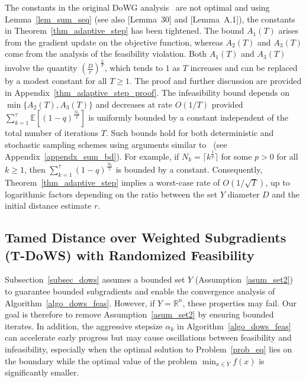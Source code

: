 \documentclass{article}
\newcommand{\EXP}[1]
{\mathbb{E}\!\left[#1\right] }
\theoremstyle{plain}
\theoremstyle{definition}
\theoremstyle{remark}
\begin{document}
The constants in the original DoWG analysis~\cite{khaled2023dowg} are not optimal and using Lemma~\ref{lem_sum_seq} (see also \cite{liu2023stochastic}[Lemma~30] and \cite{moshtaghifar2025dada}[Lemma~A.1]), the constants in Theorem~\ref{thm_adaptive_step} has been tightened. The bound $A_1(T)$ arises from the gradient update on the objective function, whereas $A_2(T)$ and $A_3(T)$ come from the analysis of the feasibility violation. Both $A_1(T)$ and $A_3(T)$ involve the quantity $\left(\frac{D}{r}\right)^{\frac{2}{T}}$, which tends to $1$ as $T$ increases and can be replaced by a modest constant for all $T \geq 1$. The proof and further discussion are provided in Appendix~\ref{thm_adaptive_step_proof}. The infeasibility bound depends on $\min \{A_2(T),A_3(T)\}$ and decreases at rate $O(1/T)$ provided $\sum_{k=1}^\tau \EXP{(1-q)^{\frac{N_{k}}{2}}}$ is uniformly bounded by a constant independent of the total number of iterations $T$. Such bounds hold for both deterministic and stochastic sampling schemes using arguments similar to~\cite{chakraborty2025randomized} (see Appendix~\ref{appendx_sum_bd}). For example, if $N_k = \lceil k^{\frac{1}{p}} \rceil$ for some $p > 0$ for all $k \geq 1$, then $\sum_{k=1}^\tau (1-q)^{\frac{N_{k}}{2}}$ is bounded by a constant. Consequently, Theorem~\ref{thm_adaptive_step} implies a worst-case rate of $O(1/\sqrt{T})$, up to logarithmic factors depending on the ratio between the set $Y$ diameter $D$ and the initial distance estimate $r$.





\subsection{Tamed Distance over Weighted Subgradients (T-DoWS) with Randomized Feasibility}

Subsection~\ref{subsec_dows} assumes a bounded set $Y$ (Assumption~\ref{asum_set2}) to guarantee bounded subgradients and enable the convergence analysis of Algorithm~\ref{algo_dows_feas}. However, if $Y = \mathbb{R}^n$, these properties may fail. Our goal is therefore to remove Assumption~\ref{asum_set2} by ensuring bounded iterates. In addition, the aggressive stepsize $\alpha_k$ in Algorithm~\ref{algo_dows_feas} can accelerate early progress but may cause oscillations between feasibility and infeasibility, especially when the optimal solution to Problem~\eqref{prob_eq} lies on the boundary while the optimal value of the problem $\min_{x \in Y} f(x)$ is significantly smaller.
\end{document}
